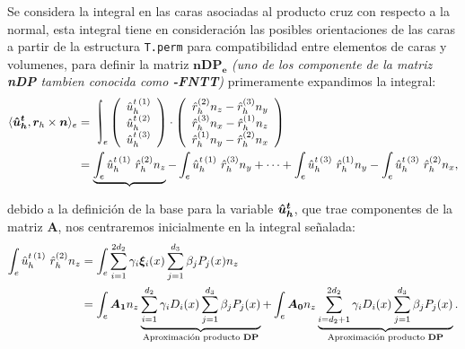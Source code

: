 \documentclass{article}
\DeclareMathOperator*{\rint}{\ThisStyle{\rotatebox{15}{$\SavedStyle\!\int\!\!\!$}}}     %
\begin{document}
\noindent Se considera la integral en las caras asociadas al producto cruz con respecto a la normal, esta integral tiene en consideración las posibles orientaciones de las caras a partir de la estructura \texttt{T.perm} para compatibilidad entre elementos de caras y volumenes, para definir la matriz $\boldsymbol{nDP_e}$ \textit{(uno de los componente de la matriz \textbf{nDP} tambien conocida como \textbf{-FNTT})} primeramente expandimos la integral:
\begin{align*}
    \facee{\vect{\hat{u}_h^t}}{\vect{r}_h \times \vect{n}} &=
    {\scalerel*[2ex]{\rint}{\begin{array}{ccc}1^1\\1^1\\1^1\end{array}}}_e
    \left(
        \begin{array}{ccc}
            \hat{u}_h^{t\,(1)} \\ \hat{u}_h^{t\,(2)} \\ \hat{u}_h^{t\,(3)}
        \end{array}
    \right) \cdot
    \left(
        \begin{array}{ccc}
            \hat{r}_h^{(2)} n_z - \hat{r}_h^{(3)} n_y \\
            \hat{r}_h^{(3)} n_x - \hat{r}_h^{(1)} n_z \\
            \hat{r}_h^{(1)} n_y - \hat{r}_h^{(2)} n_x \\
        \end{array}
    \right) \\
    &= \underbrace{\int_e \hat{u}_h^{t\,(1)}~\hat{r}_h^{(2)} n_z} - \int_e \hat{u}_h^{t\,(1)}~\hat{r}_h^{(3)} n_y + \cdots + \int_e \hat{u}_h^{t\,(3)}~\hat{r}_h^{(1)} n_y - \int_e \hat{u}_h^{t\,(3)}~\hat{r}_h^{(2)} n_x,
\end{align*}

\noindent debido a la definición de la base para la variable $\boldsymbol{\hat{u}_h^t}$, que trae componentes de la matriz $\boldsymbol{A}$, nos centraremos inicialmente en la integral señalada:
\begin{align*}
    \int_e \hat{u}_h^{t\,(1)}~\hat{r}_h^{(2)} n_z &= \int_e \sum_{i=1}^{2d_2} \gamma_i \boldsymbol{\xi}_i(x) \sum_{j=1}^{d_3} \beta_j P_j(x) n_z \\
    &= \int_e \boldsymbol{A_1} n_z \underbrace{\sum_{i=1}^{d_2} \gamma_i  D_i(x) \sum_{j=1}^{d_3} \beta_j P_j(x)}_{\text{Aproximación producto \textbf{DP}}} + \int_e \boldsymbol{A_0} n_z \underbrace{\sum_{i=d_2 +1}^{2d_2} \gamma_i D_i(x) \sum_{j=1}^{d_3} \beta_j P_j(x)}_{\text{Aproximación producto \textbf{DP}}}.
\end{align*}
\end{document}
